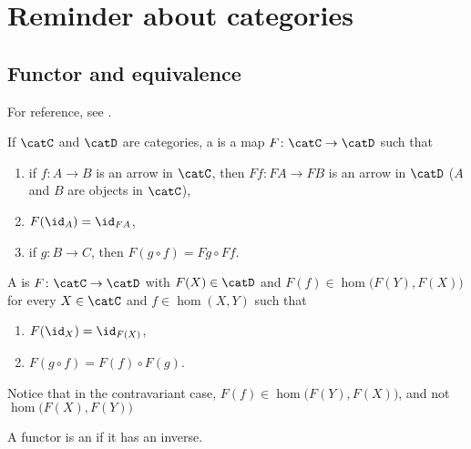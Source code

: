 \section{Reminder about categories}

\subsection{Functor and equivalence}

For reference, see \cite{BarrCateg,CatePhysisist}. 

If $\catC$ and $\catD$ are categories, a  is a map $F\colon \catC\to \catD$ such that
\begin{enumerate}
\item if $f\colon A\to B$ is an arrow in $\catC$, then $Ff\colon FA\to FB$ is an arrow in $\catD$ ($A$ and $B$ are objects in $\catC$),
\item $F(\id_A)=\id_{FA}$,
\item if $g\colon B\to C$, then $F(g\circ f)=Fg\circ Ff$. 
\end{enumerate}

A  is $F\colon \catC\to \catD$ with $F(X)\in\catD$ and $F(f)\in\hom\big( F(Y),F(X) \big)$ for every $X\in\catC$ and $f\in\hom(X,Y)$ such that
\begin{enumerate}		\label{PgPropFnctConvtra}
\item $F(\id_X)=\id_{F(X)}$,
\item $F(g\circ f)=F(f)\circ F(g)$.
\end{enumerate}
Notice that in the contravariant case, $F(f)\in\hom\big( F(Y),F(X) \big)$, and not $\hom\big( F(X),F(Y) \big)$



A functor is an  if it has an inverse. 

